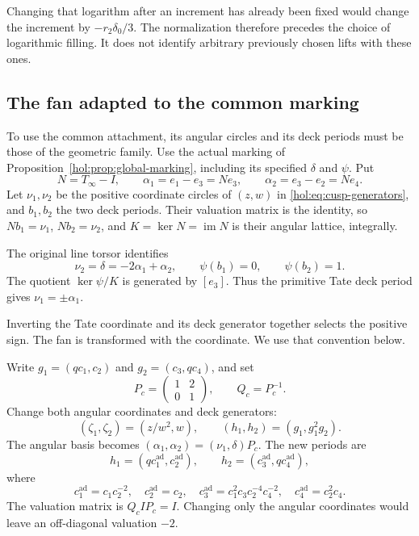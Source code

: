 \documentclass[11pt]{article}
\numberwithin{equation}{section}
\begin{document}
Changing that logarithm after an increment has already been fixed
would change the increment by $-r_2\delta_0/3$. The normalization
therefore precedes the choice of logarithmic filling. It does not
identify arbitrary previously chosen lifts with these ones.

\subsection{The fan adapted to the common marking}\label{hol:sec:adapted-fan}

To use the common attachment, its angular circles and its deck
periods must be those of the geometric family. Use the actual
marking of Proposition~\ref{hol:prop:global-marking}, including its
specified $\delta$ and $\psi$. Put
\[
 N=T_\infty-I,\qquad
 \alpha_1=e_1-e_3=Ne_3,\qquad
 \alpha_2=e_3-e_2=Ne_4.
\]
Let $\nu_1,\nu_2$ be the positive coordinate circles of $(z,w)$ in
\eqref{hol:eq:cusp-generators}, and $b_1,b_2$ the two deck periods.
Their valuation matrix is the identity, so
$Nb_1=\nu_1$, $Nb_2=\nu_2$, and
$K=\ker N=\operatorname{im}N$ is their angular lattice, integrally.

The original line torsor identifies
\[
 \nu_2=\delta=-2\alpha_1+\alpha_2,
 \qquad \psi(b_1)=0,\qquad\psi(b_2)=1.
\]
The quotient $\ker\psi/K$ is generated by $[e_3]$. Thus the primitive
Tate deck period gives $\nu_1=\pm\alpha_1$.

Inverting the Tate
coordinate and its deck generator together selects the positive sign.
The fan is transformed with the coordinate. We use that convention
below.

Write $g_1=(q c_1,c_2)$ and $g_2=(c_3,q c_4)$, and set
\[
 P_c=\begin{pmatrix}1&2\\0&1\end{pmatrix},\qquad Q_c=P_c^{-1}.
\]
Change both angular coordinates and deck generators:
\begin{equation}\label{hol:eq:cusp-shear}
 (\zeta_1,\zeta_2)=(z/w^2,w),\qquad
 (h_1,h_2)=(g_1,g_1^2g_2).
\end{equation}
The angular basis becomes $(\alpha_1,\alpha_2)=(\nu_1,\delta)P_c$.
The new periods are
\[
 h_1=(q c^{\mathrm{ad}}_1,c^{\mathrm{ad}}_2),\qquad
 h_2=(c^{\mathrm{ad}}_3,q c^{\mathrm{ad}}_4),
\]
where
\begin{equation}\label{hol:eq:adapted-units}
 c^{\mathrm{ad}}_1=c_1c_2^{-2},\quad
 c^{\mathrm{ad}}_2=c_2,\quad
 c^{\mathrm{ad}}_3=c_1^2c_3c_2^{-4}c_4^{-2},\quad
 c^{\mathrm{ad}}_4=c_2^2c_4.
\end{equation}
The valuation matrix is $Q_c I P_c=I$. Changing only the angular
coordinates would leave an off-diagonal valuation $-2$.
\end{document}
